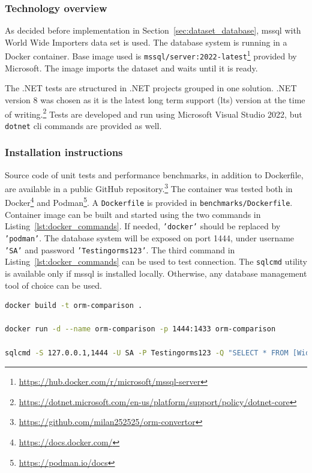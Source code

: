 \subsubsection{Technology overview}
As decided before implementation in Section~\ref{sec:dataset_database}, \acrshort{mssql} with World Wide Importers data set is used. The database system is running in a Docker container. Base image used is \texttt{mssql/server:2022-latest}\footnote{\url{https://hub.docker.com/r/microsoft/mssql-server}} provided by Microsoft. The image imports the dataset and waits until it is ready.

The .NET tests are structured in .NET projects grouped in one solution. .NET version 8 was chosen as it is the latest long term support (\acrshort{lts}) version at the time of writing.\footnote{\url{https://dotnet.microsoft.com/en-us/platform/support/policy/dotnet-core}} Tests are developed and run using Microsoft Visual Studio 2022, but \texttt{dotnet} \acrshort{cli} commands are provided as well.

\subsubsection{Installation instructions}
Source code of unit tests and performance benchmarks, in addition to Dockerfile, are available in a public GitHub repository.\footnote{\url{https://github.com/milan252525/orm-convertor}} The container was tested both in Docker\footnote{\url{https://docs.docker.com/}} and Podman\footnote{\url{https://podman.io/docs}}. A \texttt{Dockerfile} is provided in \texttt{benchmarks/Dockerfile}. Container image can be built and started using the two commands in Listing~\ref{lst:docker_commands}. If needed, \texttt{'docker'} should be replaced by \texttt{'podman'}. The database system will be exposed on port 1444, under username \texttt{'SA'} and password \texttt{'Testingorms123'}.
The third command in Listing~\ref{lst:docker_commands} can be used to test connection. The \texttt{sqlcmd} utility is available only if \acrshort{mssql} is installed locally. Otherwise, any database management tool of choice can be used.

\begin{lstlisting}[language=sh,caption={Command to build, run, and test connection to Docker container.},label={lst:docker_commands}]
docker build -t orm-comparison .

docker run -d --name orm-comparison -p 1444:1433 orm-comparison

sqlcmd -S 127.0.0.1,1444 -U SA -P Testingorms123 -Q "SELECT * FROM [WideWorldImporters].[Purchasing].[PurchaseOrders]"
\end{lstlisting}

